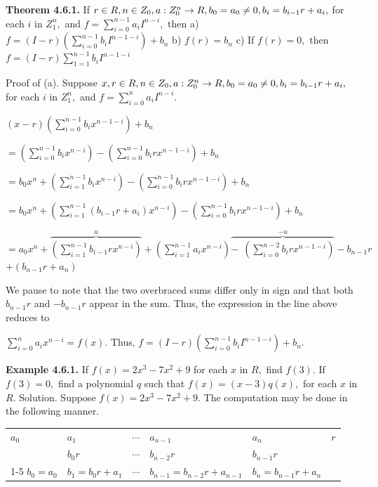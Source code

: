 \textbf{Theorem 4.6.1.} If $r \in R, n\in Z_{0}, a: Z_{0}^{n} \to R, b_{0} = a_{0} \neq 0, b_{i} = b_{i-1}r + a_{i},$
for each $i$ in $Z_{1}^{n},$ and $f = \sum_{i=0}^{n-1}a_{i}I^{n-i},$ then\nl
a) $f=(I - r)\left(\sum_{i=0}^{n-1}b_{i}I^{n-1-i}\right) + b_{n}$\nl
b) $f(r) = b_{n}$\nl
c) If $f(r) = 0,$ then $f = (I-r)\sum_{1=1}^{n-1}b_{i}I^{n-1-i}$\nl

\newpage

Proof of (a). Suppose $x,r \in R, n\in Z_{0}, a:Z_{0}^{n} \to R, b_{0} = a_{0} \neq 0, b_{i} = b_{i-1}r + a_{i},$
for each $i$ in $Z_{1}^{n},$ and $f = \sum_{i=0}^{n}a_{i}I^{n-i}.$\nl

\fl $(x - r)\left(\sum\limits_{i=0}^{n-1}b_{i}x^{n-1-i} \right) + b_{n}$\nl

$= \left(\sum\limits_{i=0}^{n-1}b_{i}x^{n-i} \right) - \left(\sum\limits_{i=0}^{n-1}b_{i}rx^{n-1-i} \right) + b_{n}$\nl

$= b_{0}x^{n} + \left(\sum\limits_{i=1}^{n-1}b_{i}x^{n-i} \right) -  \left(\sum\limits_{i=0}^{n-1}b_{i}rx^{n-1-i} \right) + b_{n}$\nl

$= b_{0}x^{n} + \left(\sum\limits_{i=1}^{n-1}(b_{i-1}r + a_{i})x^{n-i} \right) -  \left(\sum\limits_{i=0}^{n-1}b_{i}rx^{n-1-i} \right) + b_{n}$\nl

$= a_{0}x^{n} + \overbrace{\left(\sum\limits_{i=1}^{n-1}b_{i-1}rx^{n-i} \right)}^{u} + \left(\sum\limits_{i=1}^{n-1}a_{i}x^{n-i} \right)  \overbrace{-~~\left(\sum\limits_{i=0}^{n-2}b_{i}rx^{n-1-i} \right)}^{-u} -b_{n-1}r$\nl
 $ + (b_{n-1}r +a_{n}) $\nl

We pause to note that the two overbraced sums differ only in sign and that both $b_{n-1}r$ and $-b_{n-1}r$ appear in the sum.  Thus, the expression in the line above reduces to\nl

$\sum\limits_{i=0}^{n} a_{i}x^{n-i} = f(x).$  Thus, $f = (I - r)\left(\sum\limits_{i=0}^{n-1}b_{i}I^{n-1-i}\right) + b_{n}.$\nl

\textbf{Example 4.6.1.}  If $f(x) = 2x^{3} - 7x^{2} + 9$ for each $x$ in $R,$ find $f(3).$  If $f(3) = 0,$ find a polynomial $q$ such that $f(x) = (x - 3)q(x),$ for each $x$ in $R.$ \nl
Solution.  Suppose $f(x) = 2x^{3} - 7x^{2} + 9.$
The computation may be done in the following manner.\nl
\begin{tabular}{lllll|l}
$a_{0}$&$a_{1}$&$\cdots$&$a_{n-1}$&$a_{n}$&$r$\\
&$b_{0}r$&$\cdots$&$b_{n-2}r$&$b_{n-1}r$&\\ \cline{1-5}
$b_{0}=a_{0}$&$b_{1}=b_{0}r + a_{1}$&$\cdots$&$b_{n-1}=b_{n-2}r+a_{n-1}$&$b_{n}=b_{n-1}r + a_{n}$&\\
\end{tabular}\nl

